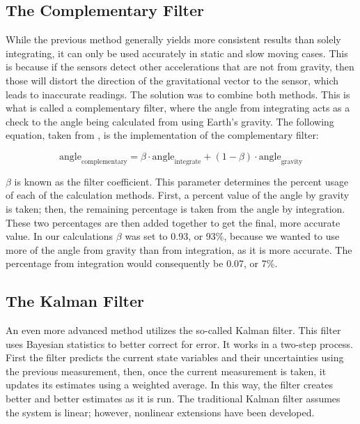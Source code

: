 \subsection{The Complementary Filter}
While the previous method generally yields more consistent results than solely integrating, it can only be used accurately in static and slow moving cases.
This is because if the sensors detect other accelerations that are not from gravity, then those will distort the direction of the gravitational vector to the sensor, which leads to inaccurate readings.
The solution was to combine both methods.
This is what is called a complementary filter, where the angle from integrating acts as a check to the angle being calculated from using Earth’s gravity.
The following equation, taken from \cite{grahn}, is the implementation of the complementary filter:

\begin{equation}
  \mathrm{angle}_{\mathrm{complementary}}=\beta\cdot\mathrm{angle}_{\mathrm{integrate}}+(1-\beta)\cdot\mathrm{angle}_{\mathrm{gravity}}\label{eq:x beta}
\end{equation}

$\beta$ is known as the filter coefficient.
This parameter determines the percent usage of each of the calculation methods.
First, a percent value of the angle by gravity is taken; then, the remaining percentage is taken from the angle by integration.
These two percentages are then added together to get the final, more accurate value.
In our calculations $\beta$ was set to 0.93, or 93\%, because we wanted to use more of the angle from gravity than from integration, as it is more accurate.
The percentage from integration would consequently be 0.07, or 7\%.\par

\subsection{The Kalman Filter}
An even more advanced method utilizes the so-called Kalman filter.
This filter uses Bayesian statistics to better correct for error.
It works in a two-step process.
First the filter predicts the current state variables and their uncertainties using the previous measurement, then, once the current measurement is taken, it updates its estimates using a weighted average.
In this way, the filter creates better and better estimates as it is run.
The traditional Kalman filter assumes the system is linear; however, nonlinear extensions have been developed.\par

